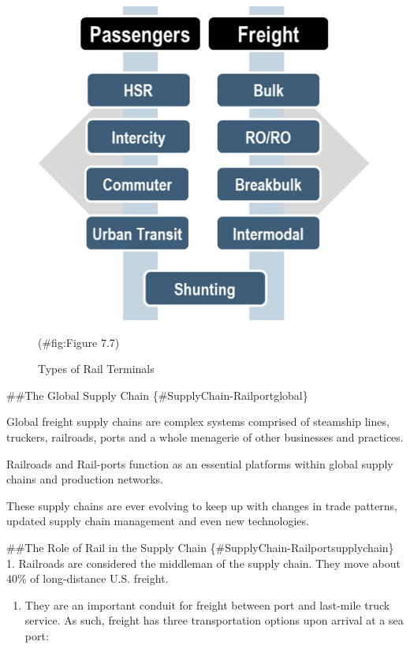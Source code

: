 \documentclass[
]{book}
\providecommand{\tightlist}{%
  \setlength{\itemsep}{0pt}\setlength{\parskip}{0pt}}
\begin{document}
\begin{figure}

{\centering \includegraphics{./Images/supplychain/Types of Rail Terminals} 

}

\caption{Types of Rail Terminals}(\#fig:Figure 7.7)
\end{figure}

\#\#The Global Supply Chain \{\#SupplyChain-Railportglobal\}

Global freight supply chains are complex systems comprised of steamship lines, truckers, railroads, ports and a whole menagerie of other businesses and practices.

Railroads and Rail-ports function as an essential platforms within global supply chains and production networks.

These supply chains are ever evolving to keep up with changes in trade patterns, updated supply chain management and even new technologies.

\#\#The Role of Rail in the Supply Chain \{\#SupplyChain-Railportsupplychain\}
1. Railroads are considered the middleman of the supply chain. They move about 40\% of long-distance U.S. freight.

\begin{enumerate}
\def\labelenumi{\arabic{enumi}.}
\setcounter{enumi}{1}
\tightlist
\item
  They are an important conduit for freight between port and last-mile truck service. As such, freight has three transportation options upon arrival at a sea port:
\end{enumerate}
\end{document}
